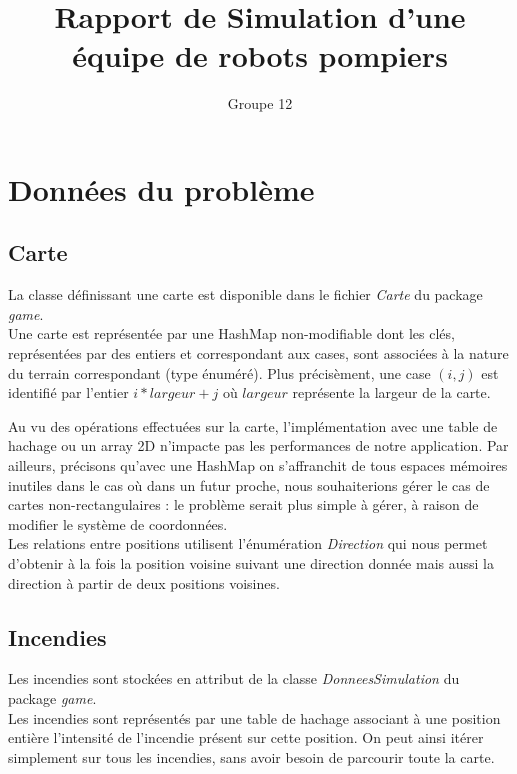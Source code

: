 \documentclass[a4paper, 10pt, french]{article}
\title{Rapport de Simulation d'une équipe de robots pompiers}
\author{Groupe 12}
\begin{document}
\maketitle

\section{Données du problème}	

	\subsection{Carte}
	\noindent La classe définissant une carte est disponible dans le fichier {\it Carte} du package {\it game}. \\

	Une carte est représentée par une HashMap non-modifiable dont les clés, représentées par des entiers et correspondant aux cases, sont associées à la nature du terrain correspondant (type énuméré). 
	Plus précisèment, une case $(i, j)$ est identifié par l'entier $i * largeur + j$ où $largeur$ représente la largeur de la carte.
	
	\noindent Au vu des opérations effectuées sur la carte, l'implémentation avec une table de hachage ou un array 2D n'impacte pas les performances de notre application. Par ailleurs, précisons qu'avec une HashMap on s'affranchit de tous espaces mémoires inutiles dans le cas où dans un futur proche, nous souhaiterions gérer le cas de cartes non-rectangulaires : le problème serait plus simple à gérer, à raison de modifier le système de coordonnées. \\

	Les relations entre positions utilisent l'énumération {\it Direction} qui nous permet d'obtenir à la fois la position voisine suivant une direction donnée mais aussi la direction à partir de deux positions voisines.

	\subsection{Incendies}
	\noindent Les incendies sont stockées en attribut de la classe {\it DonneesSimulation} du package {\it game}. \\

	Les incendies sont représentés par une table de hachage associant à une position entière l'intensité de l'incendie présent sur cette position. On peut ainsi itérer simplement sur tous les incendies, sans avoir besoin de parcourir toute la carte.
\end{document}
